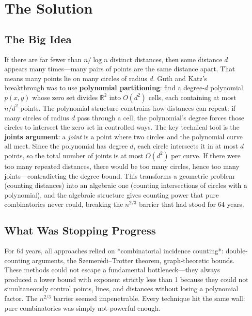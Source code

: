 \section{The Solution}

\subsection{The Big Idea}
If there are far fewer than $n/\log n$ distinct distances, then some distance $d$ appears many times---many pairs of points are the same distance apart. That means many points lie on many circles of radius $d$. Guth and Katz's breakthrough was to use \textbf{polynomial partitioning}: find a degree-$d$ polynomial $p(x,y)$ whose zero set divides $\mathbb{R}^2$ into $O(d^2)$ cells, each containing at most $n/d^2$ points. The polynomial structure constrains how distances can repeat: if many circles of radius $d$ pass through a cell, the polynomial's degree forces those circles to intersect the zero set in controlled ways. The key technical tool is the \textbf{joints argument}: a \emph{joint} is a point where two circles and the polynomial curve all meet. Since the polynomial has degree $d$, each circle intersects it in at most $d$ points, so the total number of joints is at most $O(d^2)$ per curve. If there were too many repeated distances, there would be too many circles, hence too many joints---contradicting the degree bound. This transforms a geometric problem (counting distances) into an algebraic one (counting intersections of circles with a polynomial), and the algebraic structure gives counting power that pure combinatorics never could, breaking the $n^{2/3}$ barrier that had stood for 64 years.

\subsection{What Was Stopping Progress}
For 64 years, all approaches relied on *combinatorial incidence counting*: double-counting arguments, the Szemer\'edi--Trotter theorem, graph-theoretic bounds. These methods could not escape a fundamental bottleneck---they always produced a lower bound with exponent strictly less than 1 because they could not simultaneously control points, lines, and distances without losing a polynomial factor. The $n^{2/3}$ barrier seemed impenetrable. Every technique hit the same wall: pure combinatorics was simply not powerful enough.

